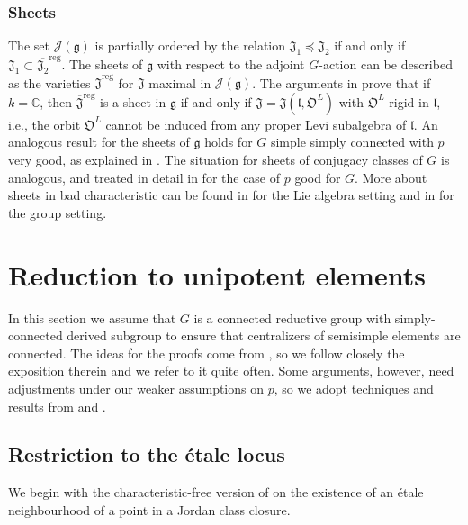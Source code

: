 \documentclass[12pt]{amsart}
\theoremstyle{definition}
\theoremstyle{remark}
\newcommand{\C}{\mathbb{C}}
\newcommand{\g}{\mathfrak{g}}
\renewcommand{\l}{\mathfrak{l}}
\newcommand{\J}{\mathfrak{J}}
\newcommand{\orb}{\mathfrak{O}}
\newcommand{\reg}{{\operatorname{reg}}}
\begin{document}
\subsubsection{Sheets}
The set $\mathcal{J}(\g)$ is partially ordered by the relation $\J_1 \preceq \J_2$ if and only if $\J_1 \subset \overline{\J_2}^\reg$.
The sheets of $\g$ with respect to the adjoint $G$-action can be described as the varieties $\overline{\J}^\reg$ for $\J$ maximal in $\mathcal{J}(\g)$.
The arguments in \cite{Borho, BK79} prove that if $k = \C$, then $\overline{\J}^\reg$ is a sheet in $\g$ if and only if $\J = \J(\l, \orb^L)$ with $\orb^L$ rigid in $\l$, i.e., the orbit $\orb^L$ cannot be induced from any proper Levi subalgebra of $\l$.
An analogous result for the sheets of $\g$ holds for $G$ simple simply connected with $p$ very good, as explained in \cite{PremSt}.
The situation for sheets of conjugacy classes of $G$ is  analogous, and treated in detail in \cite{CE1} for the case of $p$ good for $G$. More about sheets in bad characteristic can be found in \cite{Sp_bad, Sp_f4} for the Lie algebra setting and in \cite{ACEbad, Sim} for the group setting.

\section{Reduction to unipotent elements} \label{s_redunip}
In this section we assume that $G$ is a connected reductive group with simply-connected derived subgroup to ensure that centralizers of semisimple elements are connected.
The ideas for the proofs come from \cite[\S 4]{ACE}, so we follow closely the exposition therein and we refer to it quite often.
Some arguments, however, need adjustments under our weaker assumptions on $p$, so we adopt techniques and results from \cite[\S 3]{CES} and \cite[\S 7]{BR}.

\subsection{Restriction to the \'etale locus}
We begin with the characteristic-free version of \cite[Proposition 4.1]{ACE} on the existence of an \'etale neighbourhood of a point in a Jordan class closure.
\end{document}

